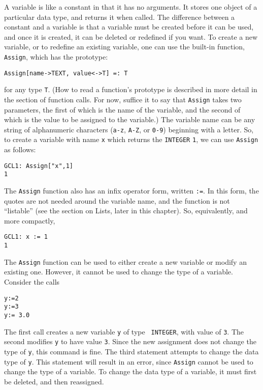 A variable is like a constant in that it has no arguments.  It stores
one object of a particular data type, and returns it when called. The
difference between a constant and a variable is that a variable must
be created before it can be used, and once it is created, it can be
deleted or redefined if you want.  To create a new variable, or to
redefine an existing variable, one can use the built-in function,
\verb+Assign+, which has the prototype:
\begin{verbatim}
Assign[name->TEXT, value<->T] =: T
\end{verbatim}
\noindent 
for any type \verb+T+.  (How to read a function's prototype is
described in more detail in the section of function calls.  For now,
suffice it to say that {\tt Assign} takes two parameters, the first of
which is the name of the variable, and the second of which is the
value to be assigned to the variable.)  The variable name can be any
string of alphanumeric characters (\verb+a-z+, \verb+A-Z+, or
\verb+0-9+) beginning with a letter.  So, to create a variable with
name \verb+x+ which returns the \verb+INTEGER+ \verb+1+, we can use
\verb+Assign+ as follows:

\begin{verbatim}
GCL1: Assign["x",1]
1
\end{verbatim}


\noindent 
The {\tt Assign} function also has an infix operator form, written
{\tt :=}.  In this form, the quotes are not needed around the variable
name, and the function is not ``listable'' (see the section on Lists,
later in this chapter).  So, equivalently, and more compactly,

\begin{verbatim}
GCL1: x := 1
1
\end{verbatim}

The {\tt Assign} function can be used to either create a new variable or
modify an existing one.  However, it cannot be used to change the type
of a variable.  Consider the calls

\begin{verbatim}
y:=2
y:=3
y:= 3.0
\end{verbatim}

\noindent The first call creates a new variable {\tt y} of type {\tt
INTEGER}, with value of \verb+3+.  The second modifies \verb+y+ to
have value \verb+3+.  Since the new assignment does not change the
type of \verb+y+, this command is fine.  The third statement attempts
to change the data type of \verb+y+.  This statement will result in an
error, since {\tt Assign} cannot be used to change the type of a
variable.  To change the data type of a variable, it must first be
deleted, and then reassigned.  

